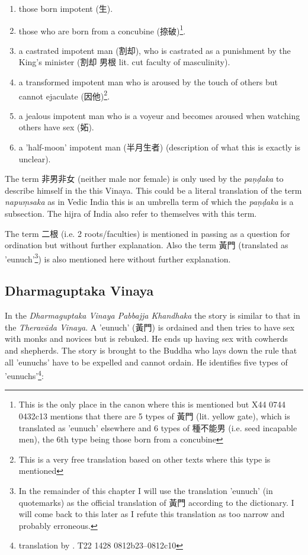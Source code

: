 \begin{enumerate}
\item those born impotent (生). 
\item those who are born from a concubine (捺破)\footnote{This is the only place in the canon where this is mentioned but X44 0744 0432c13 mentions that there are 5 types of 黃門 (lit. yellow gate), which is translated as 'eunuch' elsewhere and 6 types of 種不能男 (i.e. seed incapable men), the 6th type being those born from a concubine}.
\item a castrated impotent man (割却), who is castrated as a punishment by the King's minister (割却 男根 lit. cut faculty of masculinity).
\item a transformed impotent man who is aroused by the touch of others but cannot ejaculate (因他)\footnote{This is a very free translation based on other texts where this type is mentioned}.
\item a jealous impotent man who is a voyeur and becomes aroused when watching others have sex (妬).
\item a 'half-moon' impotent man (半月生者) (description of what this is exactly is unclear).
\end{enumerate}

The term 非男非女 (neither male nor female) is only used by the {\em paṇḍaka} to describe himself in the this Vinaya. This could be a literal translation of the term {\em napuṃsaka} as in Vedic India this is an umbrella term of which the {\em paṇḍaka} is a subsection. The hijra of India also refer to themselves with this term.

The term 二根 (i.e. 2 roots/faculties) is mentioned in passing as a question for ordination but without further explanation. Also the term 黃門 (translated as 'eunuch'\footnote{In the remainder of this chapter I will use the translation 'eunuch' (in quotemarks) as the official translation of 黃門 according to the dictionary. I will come back to this later as I refute this translation as too narrow and probably erroneous.}) is also mentioned here without further explanation.


\subsection{Dharmaguptaka Vinaya}
In the {\em Dharmaguptaka Vinaya Pabbajja Khandhaka} the story is similar to that in the {\em Theravāda Vinaya}. A 'eunuch' (黃門) is ordained and then tries to have sex with monks and novices but is rebuked. He ends up having sex with cowherds and shepherds. The story is brought to the Buddha who lays down the rule that all 'eunuchs' have to be expelled and cannot ordain. He identifies five types of 'eunuchs'\footnote{translation by \cite{bodhi}. T22 1428 0812b23–0812c10}: 

